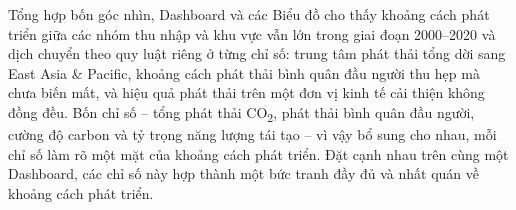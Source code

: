 Tổng hợp bốn góc nhìn, Dashboard và các Biểu đồ cho thấy khoảng cách phát triển giữa các nhóm thu nhập và khu vực vẫn lớn trong giai đoạn 2000--2020 và dịch chuyển theo quy luật riêng ở từng chỉ số: trung tâm phát thải tổng dời sang East Asia \& Pacific, khoảng cách phát thải bình quân đầu người thu hẹp mà chưa biến mất, và hiệu quả phát thải trên một đơn vị kinh tế cải thiện không đồng đều. Bốn chỉ số -- tổng phát thải CO\textsubscript{2}, phát thải bình quân đầu người, cường độ carbon và tỷ trọng năng lượng tái tạo -- vì vậy bổ sung cho nhau, mỗi chỉ số làm rõ một mặt của khoảng cách phát triển. Đặt cạnh nhau trên cùng một Dashboard, các chỉ số này hợp thành một bức tranh đầy đủ và nhất quán về khoảng cách phát triển.
